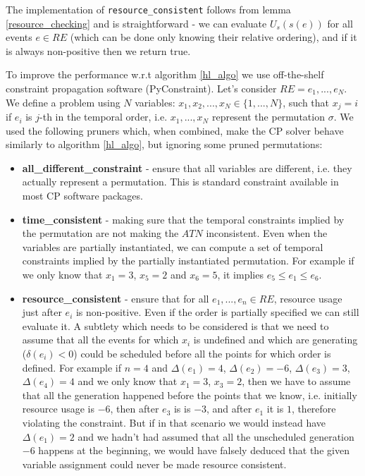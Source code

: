 \vspace{10mm}

The implementation of \texttt{resource\_consistent} follows from lemma \ref{resource_checking} and is straightforward - we can evaluate $U_s(s(e))$ for all events $e \in RE$ (which can be done only knowing their relative ordering), and if it is always non-positive then we return true.

To improve the performance w.r.t algorithm \ref{hl_algo} we use off-the-shelf constraint propagation software (PyConstraint). Let's consider $RE={e_1, ..., e_N}$. We define a problem using $N$ variables:  $x_1, x_2, ..., x_N \in \{ 1, ..., N \}$, such that $x_j=i$ if $e_i$ is $j$-th in the temporal order, i.e. $x_1, ..., x_N$ represent the permutation $\sigma$. We used the following pruners which, when combined, make the CP solver behave similarly to algorithm \ref{hl_algo}, but ignoring some pruned permutations:
\begin{itemize}
\setlength\itemsep{0.2em}
\item \textbf{all\_different\_constraint} - ensure that all variables are different, i.e. they actually represent a permutation. This is standard constraint available in most CP software packages.
\item \textbf{time\_consistent} - making sure that the temporal constraints implied by the permutation are not making the $ATN$ inconsistent. Even when the variables are partially instantiated, we can compute a set of temporal constraints implied by the partially instantiated permutation. For example if we only know that $x_1 = 3$, $x_5 = 2$ and $x_6=5$, it implies $e_5 \leq e_1 \leq e_6$.
\item \textbf{resource\_consistent} - ensure that for all $e_1, ..., e_n \in RE$, resource usage just after $e_i$ is non-positive. Even if the order is partially specified we can still evaluate it. A subtlety which needs to be considered is that we need to assume that all the events for which $x_i$ is undefined and which are generating ($\delta(e_i) < 0$) could be scheduled before all the points for which order is defined. For example if $n = 4$ and $\Delta(e_1) = 4$, $\Delta(e_2) = -6$, $\Delta(e_3) = 3$, $\Delta(e_4) = 4$ and we only know that $x_1 = 3$, $x_3 = 2$, then we have to assume that all the generation happened before the points that we know, i.e. initially resource usage is $-6$, then after $e_3$ is is $-3$, and after $e_1$ it is $1$, therefore violating the constraint. But if in that scenario we would instead have $\Delta(e_1) = 2$ and we hadn't had assumed that all the unscheduled generation $-6$ happens at the beginning, we would have falsely deduced that the given variable assignment could never be made resource consistent.
\end{itemize}


